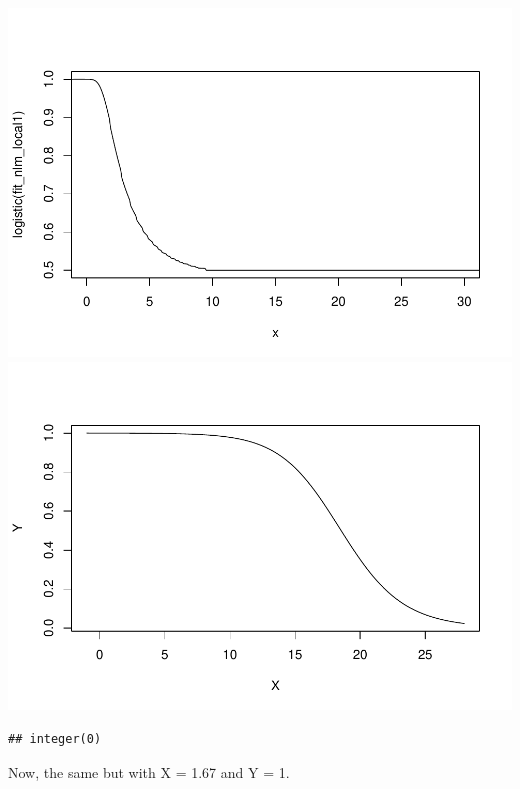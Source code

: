 \documentclass[
]{article}
\begin{document}
\includegraphics{Problemsetrmd_files/figure-latex/unnamed-chunk-7-1.pdf}
\includegraphics{Problemsetrmd_files/figure-latex/unnamed-chunk-7-2.pdf}

\begin{verbatim}
## integer(0)
\end{verbatim}

Now, the same but with X = 1.67 and Y = 1.
\end{document}
